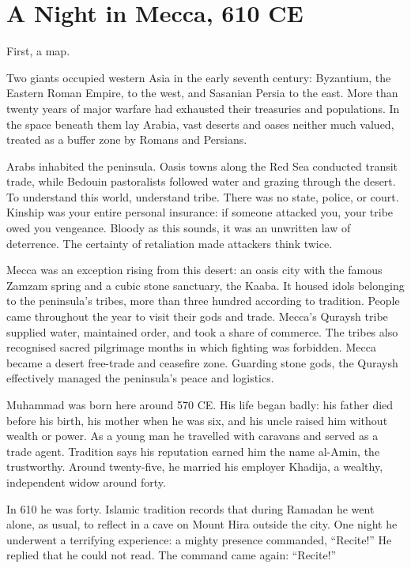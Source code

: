 \section{A Night in Mecca, 610 CE}
First, a map.

Two giants occupied western Asia in the early seventh century: Byzantium, the Eastern Roman Empire, to the west, and Sasanian Persia to the east. More than twenty years of major warfare had exhausted their treasuries and populations. In the space beneath them lay Arabia, vast deserts and oases neither much valued, treated as a buffer zone by Romans and Persians.

Arabs inhabited the peninsula. Oasis towns along the Red Sea conducted transit trade, while Bedouin pastoralists followed water and grazing through the desert. To understand this world, understand tribe. There was no state, police, or court. Kinship was your entire personal insurance: if someone attacked you, your tribe owed you vengeance. Bloody as this sounds, it was an unwritten law of deterrence. The certainty of retaliation made attackers think twice.

Mecca was an exception rising from this desert: an oasis city with the famous Zamzam spring and a cubic stone sanctuary, the Kaaba. It housed idols belonging to the peninsula's tribes, more than three hundred according to tradition. People came throughout the year to visit their gods and trade. Mecca's Quraysh tribe supplied water, maintained order, and took a share of commerce. The tribes also recognised sacred pilgrimage months in which fighting was forbidden. Mecca became a desert free-trade and ceasefire zone. Guarding stone gods, the Quraysh effectively managed the peninsula's peace and logistics.

Muhammad was born here around 570 CE. His life began badly: his father died before his birth, his mother when he was six, and his uncle raised him without wealth or power. As a young man he travelled with caravans and served as a trade agent. Tradition says his reputation earned him the name al-Amin, the trustworthy. Around twenty-five, he married his employer Khadija, a wealthy, independent widow around forty.

In 610 he was forty. Islamic tradition records that during Ramadan he went alone, as usual, to reflect in a cave on Mount Hira outside the city. One night he underwent a terrifying experience: a mighty presence commanded, ``Recite!'' He replied that he could not read. The command came again: ``Recite!''

